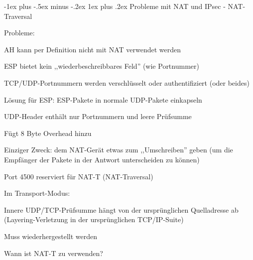 \documentclass[a4paper]{article}
\makeatletter
\renewcommand{\subsubsection}{\@startsection{subsubsection}{3}{0mm}%
 {-1ex plus -.5ex minus -.2ex}%
 {1ex plus .2ex}%
 {\normalfont\small\bfseries}}
\makeatother
\begin{document}
\begin{multicols}{3}
\begin{itemize*}
            \subsubsection{Probleme mit NAT und IPsec - NAT-Traversal}
            \begin{itemize*}
                  \item Probleme:
                  \begin{itemize*}
                        \item AH kann per Definition nicht mit NAT verwendet werden
                        \item ESP bietet kein ,,wiederbeschreibbares Feld'' (wie Portnummer)
                        \item TCP/UDP-Portnummern werden verschlüsselt oder authentifiziert (oder beides)
                  \end{itemize*}
                  \item Lösung für ESP: ESP-Pakete in normale UDP-Pakete einkapseln
                  \item UDP-Header enthält nur Portnummern und leere Prüfsumme
                  \begin{itemize*}
                        \item Fügt 8 Byte Overhead hinzu
                        \item Einziger Zweck: dem NAT-Gerät etwas zum ,,Umschreiben'' geben (um die Empfänger der Pakete in der Antwort unterscheiden zu können)
                        \item Port 4500 reserviert für NAT-T (NAT-Traversal)
                  \end{itemize*}
                  \item
                  Im Transport-Modus:

                  \begin{itemize*}
                        \item Innere UDP/TCP-Prüfsumme hängt von der ursprünglichen Quelladresse ab (Layering-Verletzung in der ursprünglichen TCP/IP-Suite)
                        \item Muss wiederhergestellt werden
                  \end{itemize*}
                  \item
                  Wann ist NAT-T zu verwenden?


\end{itemize*}
\end{itemize*}
\end{multicols}
\end{document}
